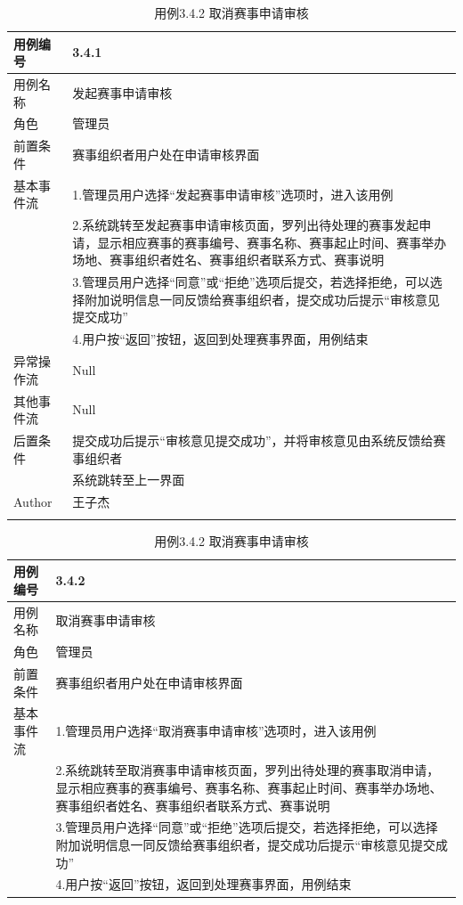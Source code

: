\documentclass[a4paper,UTF8]{article}
\begin{document}
\begin{table}[H]
	\begin{center}
		\caption{用例3.4.1 发起赛事申请审核}
		\label{table:Tab_uc341}
		\begin{tabular}{|p{}|p{}|}
			\hline\noalign{\smallskip}
			用例编号 & 3.4.1\\
			\hline
			用例名称 &  发起赛事申请审核\\
			\hline
			角色 & 管理员\\
			\hline
			前置条件 & 赛事组织者用户处在申请审核界面 \\
			\hline
			基本事件流 & 1.管理员用户选择“发起赛事申请审核”选项时，进入该用例 \\& 2.系统跳转至发起赛事申请审核页面，罗列出待处理的赛事发起申请，显示相应赛事的赛事编号、赛事名称、赛事起止时间、赛事举办场地、赛事组织者姓名、赛事组织者联系方式、赛事说明\\& 3.管理员用户选择“同意”或“拒绝”选项后提交，若选择拒绝，可以选择附加说明信息一同反馈给赛事组织者，提交成功后提示“审核意见提交成功” \\& 4.用户按“返回”按钮，返回到处理赛事界面，用例结束\\
			\hline
			异常操作流 & Null \\
			\hline
			其他事件流 & Null \\
			\hline
			后置条件 & 提交成功后提示“审核意见提交成功”，并将审核意见由系统反馈给赛事组织者\\& 系统跳转至上一界面 \\
			\hline
			Author & 王子杰 \\
			\noalign{\smallskip}
			\hline
			\noalign{\smallskip}
		\end{tabular}
		\caption{用例3.4.2 取消赛事申请审核}
		\label{table:Tab_uc342}
		\begin{tabular}{|p{}|p{}|}
			\hline\noalign{\smallskip}
			用例编号 & 3.4.2\\
			\hline
			用例名称 &  取消赛事申请审核\\
			\hline
			角色 & 管理员\\
			\hline
			前置条件 & 赛事组织者用户处在申请审核界面 \\
			\hline
			基本事件流 & 1.管理员用户选择“取消赛事申请审核”选项时，进入该用例 \\& 2.系统跳转至取消赛事申请审核页面，罗列出待处理的赛事取消申请，显示相应赛事的赛事编号、赛事名称、赛事起止时间、赛事举办场地、赛事组织者姓名、赛事组织者联系方式、赛事说明\\& 3.管理员用户选择“同意”或“拒绝”选项后提交，若选择拒绝，可以选择附加说明信息一同反馈给赛事组织者，提交成功后提示“审核意见提交成功” \\& 4.用户按“返回”按钮，返回到处理赛事界面，用例结束\\

\end{tabular}
\end{center}
\end{table}
\end{document}
